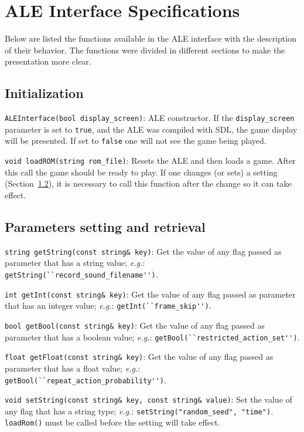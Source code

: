 \documentclass[12pt]{article}
\begin{document}
\section{ALE Interface Specifications}\label{sec:functions}

Below are listed the functions available in the ALE interface with the description of their 
behavior. The functions were divided in different sections to make the presentation more
clear.

  \subsection{Initialization}

  \indent \indent \verb+ALEInterface(bool display_screen)+: ALE constructor. If the 
  \verb+display_screen+ parameter is set to \verb+true+, and the ALE was compiled
  with SDL, the game display will be presented. If set to \verb+false+ one will not see
  the game being played.
  
  \verb+void loadROM(string rom_file)+: Resets the ALE and then loads a game. After this call
  the game should be ready to play. If one changes (or sets) a setting (Section~\ref{sec:getSet}), 
  it is necessary to call this function after the change so it can take effect.
  
  \subsection{Parameters setting and retrieval}\label{sec:getSet}
  
  \indent \indent \verb+string getString(const string& key)+: Get the value of any flag passed
  as parameter that has a string value; \emph{e.g.}: \verb+getString(``record_sound_filename'')+.

  \verb+int getInt(const string& key)+: Get the value of any flag passed as parameter that has 
  an integer value; \emph{e.g.}: \verb+getInt(``frame_skip'')+.

  \verb+bool getBool(const string& key)+: Get the value of any flag passed as parameter that has 
  a boolean value; \emph{e.g.}: \verb+getBool(``restricted_action_set'')+. 
  
  \verb+float getFloat(const string& key)+: Get the value of any flag passed as parameter that has 
  a float value; \emph{e.g.}: \verb+getBool(``repeat_action_probability'')+.   
  
  \verb+void setString(const string& key, const string& value)+: Set the value of any flag
  that has a string type; \emph{e.g.}: \verb+setString("random_seed", "time")+.
  \verb+loadRom()+ must be called before the setting will take effect.
  
\end{document}

